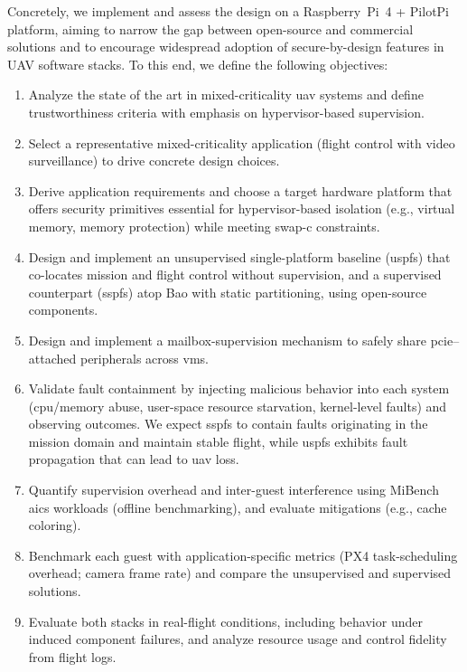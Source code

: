Concretely, we implement and assess the design on a Raspberry~Pi~4 + PilotPi
platform, aiming to narrow the gap between open-source and commercial solutions
and to encourage widespread adoption of secure-by-design features in UAV
software stacks.
%
To this end, we define the following objectives:
\begin{enumerate}
\item Analyze the state of the art in mixed-criticality \gls{uav} systems and
      define trustworthiness criteria with emphasis on hypervisor-based supervision.
\item Select a representative mixed-criticality application (flight control with
      video surveillance) to drive concrete design choices.
\item Derive application requirements and choose a target hardware platform that
      offers security primitives essential for hypervisor-based isolation (e.g.,
      virtual memory, memory protection) while meeting \gls{swap-c} constraints.
\item Design and implement an unsupervised single-platform baseline (\gls{uspfs})
      that co-locates mission and flight control without supervision, and a
      supervised counterpart (\gls{sspfs}) atop Bao with static partitioning,
      using open-source components.
\item Design and implement a mailbox-supervision mechanism to safely share
      \gls{pcie}--attached peripherals across \glspl{vm}.
\item Validate fault containment by injecting malicious behavior into each system
      (\gls{cpu}/memory abuse, user-space resource starvation, kernel-level faults) and
      observing outcomes. We expect \gls{sspfs} to contain faults originating in
      the mission domain and maintain stable flight, while \gls{uspfs} exhibits
      fault propagation that can lead to \gls{uav} loss.
\item Quantify supervision overhead and inter-guest interference using MiBench
      \gls{aics} workloads (offline benchmarking), and evaluate mitigations
      (e.g., cache coloring).
\item Benchmark each guest with application-specific metrics (PX4 task-scheduling
      overhead; camera frame rate) and compare the unsupervised and supervised
      solutions.
\item Evaluate both stacks in real-flight conditions, including behavior under
      induced component failures, and analyze resource usage and control fidelity
      from flight logs.
\end{enumerate}

